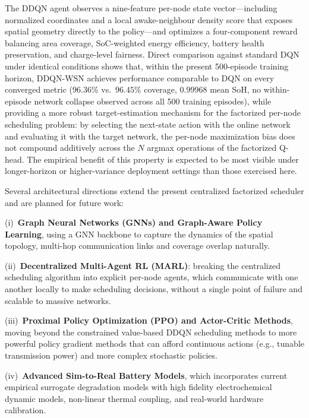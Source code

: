 \documentclass[journal]{IEEEtran}
\begin{document}
The DDQN agent observes a nine-feature per-node state vector—including
normalized coordinates and a local awake-neighbour density score that
exposes spatial geometry directly to the policy—and optimizes a
four-component reward balancing area coverage, SoC-weighted energy
efficiency, battery health preservation, and charge-level fairness.
Direct comparison against standard DQN under identical conditions
shows that, within the present 500-episode training horizon,
DDQN-WSN achieves performance comparable to DQN on every converged
metric ($96.36\%$ vs.\ $96.45\%$ coverage, $0.99968$ mean SoH, no
within-episode network collapse observed across all 500 training
episodes), while providing a more robust target-estimation mechanism
for the factorized per-node scheduling problem: by selecting the
next-state action with the online network and evaluating it with the
target network, the per-node maximization bias does not compound
additively across the $N$ argmax operations of the factorized
Q-head. The empirical benefit of this property is expected to be most
visible under longer-horizon or higher-variance deployment settings
than those exercised here.

Several architectural directions extend the present centralized
factorized scheduler and are planned for future work:

(i)~\textbf{Graph Neural Networks (GNNs) and Graph-Aware Policy Learning}, using a GNN backbone to capture the dynamics of the spatial topology, multi-hop communication links and coverage overlap naturally.

(ii)~\textbf{Decentralized Multi-Agent RL (MARL)}: breaking the centralized scheduling algorithm into explicit per-node agents, which communicate with one another locally to make scheduling decisions, without a single point of failure and scalable to massive networks.

(iii)~\textbf{Proximal Policy Optimization (PPO) and Actor-Critic Methods}, moving beyond the constrained value-based DDQN scheduling methods to more powerful policy gradient methods that can afford continuous actions (e.g., tunable transmission power) and more complex stochastic policies.

(iv)~\textbf{Advanced Sim-to-Real Battery Models}, which incorporates current empirical surrogate degradation models with high fidelity electrochemical dynamic models, non-linear thermal coupling, and real-world hardware calibration.
\end{document}
